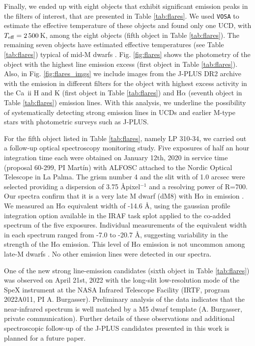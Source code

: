 Finally, we ended up with eight objects that exhibit significant emission peaks in the filters of interest, that are presented in Table \ref{tab:flares}. We used \texttt{VOSA} to estimate the effective temperature of these objects and found only one UCD, with $T_{\rm eff}=2\,500$\,K, among the eight objects (fifth object in Table \ref{tab:flares}). The remaining seven objects have estimated effective temperatures (see Table \ref{tab:flares}) typical of mid-M dwarfs \citep{zhang_2018_midm}. Fig. \ref{fig:flares} shows the photometry of the object with the highest line emission excess (first object in Table \ref{tab:flares}). Also, in Fig. \ref{fig:flares_imgs} we include images from the J-PLUS DR2 archive with the emission in different filters for the object with highest excess activity in the Ca~{\sc ii} H and K (first object in Table \ref{tab:flares}) and H$\alpha$ (seventh object in Table \ref{tab:flares}) emission lines. With this analysis, we underline the possibility of systematically detecting strong emission lines in UCDs and earlier M-type stars with photometric surveys such as J-PLUS.

For the fifth  object listed in Table \ref{tab:flares}, namely LP 310-34, we carried out a follow-up optical spectroscopy monitoring study. Five exposures of half an hour integration time each were obtained on January 12th, 2020 in service time (proposal 60-299, PI Martín) with ALFOSC attached to the Nordic Optical Telescope in La Palma. The grism number 4 and the slit with of 1.0 arcsec were selected providing a dispersion of 3.75 \AA pixel$^{-1}$ and a resolving power of R=700. Our spectra confirm that it is a very late M dwarf (dM8) with H$\alpha$ in emission \citep{Schmidt2007}. We measured an H$\alpha$ equivalent width of -14.6 \AA , using the gaussian profile integration option available in the IRAF task splot applied to the co-added spectrum of the five exposures. Individual measurements of the equivalent width in each spectrum ranged from -7.0 to -20.7 \AA , suggesting variability in the strength of the H$\alpha$ emission. This level of H$\alpha$ emission is not uncommon among late-M dwarfs \citep{Martin2010,Pineda2016}. No other emission lines were detected in our spectra.

One of the new strong line-emission candidates (sixth object in Table \ref{tab:flares}) was observed on April 21st, 2022 with the long-slit low-resolution mode of the SpeX instrument \citep{Rayner2003} at the NASA Infrared Telescope Facility (IRTF, program 2022A011, PI A. Burgasser). Preliminary analysis of the data indicates that the near-infrared spectrum is well matched by a M5 dwarf template (A. Burgasser, private communication). Further details of these observations and additional spectroscopic follow-up of the J-PLUS candidates presented in this work is planned for a future paper.

